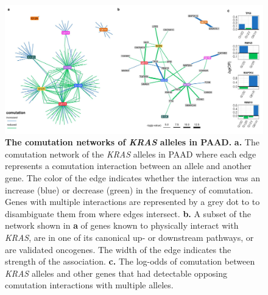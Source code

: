 \documentclass[english, 10pt, letterpaper]{article}
\newcommand{\KRAS}{\emph{KRAS}}
\begin{document}
\begin{figure}[h!]
\centering
\includegraphics[width=180mm]{figures/Supp_Fig_5.jpeg}
\caption{
    \textbf{The comutation networks of \KRAS{} alleles in PAAD.}
    \textbf{a.} The comutation network of the \KRAS{} alleles in PAAD where each edge represents a comutation interaction between an allele and another gene. The color of the edge indicates whether the interaction was an increase (blue) or decrease (green) in the frequency of comutation. Genes with multiple interactions are represented by a grey dot to to disambiguate them from where edges intersect.
    \textbf{b.} A subset of the network shown in \textbf{a} of genes known to physically interact with \KRAS{}, are in one of its canonical up- or downstream pathways, or are validated oncogenes. The width of the edge indicates the strength of the association.
    \textbf{c.} The log-odds of comutation between \KRAS{} alleles and other genes that had detectable opposing comutation interactions with multiple alleles.
}
\label{sfig:paad-comutation-network}
\end{figure}
\newpage
\end{document}
